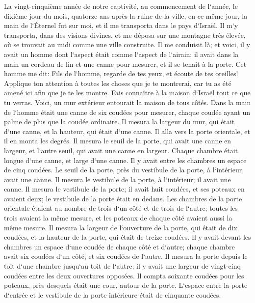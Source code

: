 \verse La vingt-cinquième année de notre captivité, au commencement de l`année, le dixième jour du mois, quatorze ans après la ruine de la ville, en ce même jour, la main de l`Éternel fut sur moi, et il me transporta dans le pays d`Israël. 
\verse Il m`y transporta, dans des visions divines, et me déposa sur une montagne très élevée, où se trouvait au midi comme une ville construite. 
\verse Il me conduisit là; et voici, il y avait un homme dont l`aspect était comme l`aspect de l`airain; il avait dans la main un cordeau de lin et une canne pour mesurer, et il se tenait à la porte. 
\verse Cet homme me dit: Fils de l`homme, regarde de tes yeux, et écoute de tes oreilles! Applique ton attention à toutes les choses que je te montrerai, car tu as été amené ici afin que je te les montre. Fais connaître à la maison d`Israël tout ce que tu verras. 
\verse Voici, un mur extérieur entourait la maison de tous côtés. Dans la main de l`homme était une canne de six coudées pour mesurer, chaque coudée ayant un palme de plus que la coudée ordinaire. Il mesura la largeur du mur, qui était d`une canne, et la hauteur, qui était d`une canne. 
\verse Il alla vers la porte orientale, et il en monta les degrés. Il mesura le seuil de la porte, qui avait une canne en largeur, et l`autre seuil, qui avait une canne en largeur. 
\verse Chaque chambre était longue d`une canne, et large d`une canne. Il y avait entre les chambres un espace de cinq coudées. Le seuil de la porte, près du vestibule de la porte, à l`intérieur, avait une canne. 
\verse Il mesura le vestibule de la porte, à l`intérieur; il avait une canne. 
\verse Il mesura le vestibule de la porte; il avait huit coudées, et ses poteaux en avaient deux; le vestibule de la porte était en dedans. 
\verse Les chambres de la porte orientale étaient au nombre de trois d`un côté et de trois de l`autre; toutes les trois avaient la même mesure, et les poteaux de chaque côté avaient aussi la même mesure. 
\verse Il mesura la largeur de l`ouverture de la porte, qui était de dix coudées, et la hauteur de la porte, qui était de treize coudées. 
\verse Il y avait devant les chambres un espace d`une coudée de chaque côté et d`autre; chaque chambre avait six coudées d`un côté, et six coudées de l`autre. 
\verse Il mesura la porte depuis le toit d`une chambre jusqu`au toit de l`autre; il y avait une largeur de vingt-cinq coudées entre les deux ouvertures opposées. 
\verse Il compta soixante coudées pour les poteaux, près desquels était une cour, autour de la porte. 
\verse L`espace entre la porte d`entrée et le vestibule de la porte intérieure était de cinquante coudées. 
